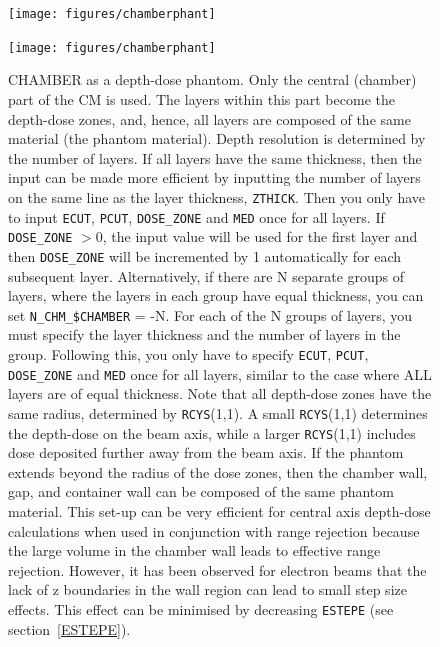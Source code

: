 \documentclass[12pt,twoside]{article}
\begin{document}
\begin{figure}[htbp]
\begin{center}
\leavevmode
\mbox{}\hspace{0cm}
\begin{latexonly}
\texttt{[image: figures/chamberphant]}
\end{latexonly}
\begin{htmlonly}
\texttt{[image: figures/chamberphant]}
\end{htmlonly}
\end{center}
\caption[CHAMBER CM as a phantom]
{CHAMBER as a depth-dose phantom.  Only the central (chamber) part of
the CM is used.  The layers within this part become the depth-dose
zones, and, hence, all layers are composed of the same material (the
phantom material).  Depth resolution is determined by the number of
layers.  If all layers have the same thickness, then the input can
be made more efficient by inputting the number of layers on the same
line as the layer thickness, {\tt ZTHICK}.  Then you only have to
input {\tt ECUT}, {\tt PCUT}, {\tt DOSE\_ZONE} and {\tt MED} once for
all layers.  If {\tt DOSE\_ZONE} $>$0, the input value will be used
for the first layer and then {\tt DOSE\_ZONE} will be incremented by 1
automatically for each subsequent layer.
Alternatively, if there are N separate groups of layers, where the layers
in each group have equal thickness,
you can set {\tt N\_CHM\_\$CHAMBER} = -N.  For each of the N groups of
layers, you must specify the layer thickness and the number
of layers in the group.  Following this, you only have to specify
{\tt ECUT}, {\tt PCUT}, {\tt DOSE\_ZONE} and {\tt MED} once for all layers,
similar to the case where ALL layers are of equal thickness.
Note that all depth-dose zones have the same radius, determined by
{\tt RCYS}(1,1).
A small {\tt RCYS}(1,1) determines the depth-dose on the beam
axis, while a larger {\tt RCYS}(1,1) includes dose deposited further away from
the beam axis.  If the phantom extends beyond the radius of the dose
zones, then the chamber wall, gap, and container wall can be composed of
the same phantom material. This set-up can be very efficient for central
axis depth-dose calculations when used in conjunction with range
rejection because the large volume in the chamber wall leads to
effective range rejection. However, it has been observed for electron
beams that the lack of z boundaries in the wall region can lead to small
step size effects.  This effect can be minimised by decreasing
{\tt ESTEPE} (see section~\ref{ESTEPE}).}
\label{fig_CHAMBERPHANT}
\end{figure}
\end{document}
